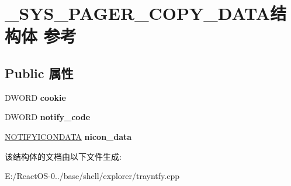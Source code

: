 \hypertarget{struct___s_y_s___p_a_g_e_r___c_o_p_y___d_a_t_a}{}\section{\+\_\+\+S\+Y\+S\+\_\+\+P\+A\+G\+E\+R\+\_\+\+C\+O\+P\+Y\+\_\+\+D\+A\+T\+A结构体 参考}
\label{struct___s_y_s___p_a_g_e_r___c_o_p_y___d_a_t_a}
\subsection*{Public 属性}
\begin{DoxyCompactItemize}
\item 
\mbox{\label{struct___s_y_s___p_a_g_e_r___c_o_p_y___d_a_t_a_acfdb3be402bf5bf95a1c8c8796e45f50}} 
D\+W\+O\+RD {\bfseries cookie}
\item 
\mbox{\label{struct___s_y_s___p_a_g_e_r___c_o_p_y___d_a_t_a_a1951802908469b00422e7faa941a11c1}} 
D\+W\+O\+RD {\bfseries notify\+\_\+code}
\item 
\mbox{\label{struct___s_y_s___p_a_g_e_r___c_o_p_y___d_a_t_a_a438e47e9a71e7fa67483356793865ffc}} 
\hyperlink{struct___n_o_t_i_f_y_i_c_o_n_d_a_t_a_a}{N\+O\+T\+I\+F\+Y\+I\+C\+O\+N\+D\+A\+TA} {\bfseries nicon\+\_\+data}
\end{DoxyCompactItemize}


该结构体的文档由以下文件生成\+:\begin{DoxyCompactItemize}
\item 
E\+:/\+React\+O\+S-\/0../base/shell/explorer/trayntfy.\+cpp\end{DoxyCompactItemize}
